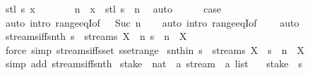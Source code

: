 \begin{isabellebody}
\ {\isacharparenleft}stl\ s\ x{\isacharparenright}\isanewline
\ \ \ \ \isamarkupfalse%
\ \isamarkupfalse%
\ n\ \ {\isachardoublequoteopen}x\ {\isacharequal}\ stl\ s\ {\isacharbang}{\isacharbang}\ n{\isachardoublequoteclose}\ \isamarkupfalse%
\ auto\isanewline
\ \ \ \ \isamarkupfalse%
\ {\isacharquery}case\ \isamarkupfalse%
\ {\isacharparenleft}auto\ intro{\isacharcolon}\ range{\isacharunderscore}eqI{\isacharbrackleft}of\ {\isacharunderscore}\ {\isacharunderscore}\ {\isachardoublequoteopen}Suc\ n{\isachardoublequoteclose}{\isacharbrackright}{\isacharparenright}\isanewline
\ \ \isamarkupfalse%
\ {\isacharparenleft}auto\ intro{\isacharcolon}\ range{\isacharunderscore}eqI{\isacharbrackleft}of\ {\isacharunderscore}\ {\isacharunderscore}\ {}{\isacharbrackright}{\isacharparenright}\isanewline
{}\isamarkupfalse%
\ auto%
\endisatagproof
{\isafoldproof}%
%
\isadelimproof
\isanewline
%
\endisadelimproof
\isanewline
{}\isamarkupfalse%
\ streams{\isacharunderscore}iff{\isacharunderscore}snth{\isacharcolon}\ {\isachardoublequoteopen}s\ {\isasymin}\ streams\ X\ {\isasymlongleftrightarrow}\ {\isacharparenleft}{\isasymforall}n{\isachardot}\ s\ {\isacharbang}{\isacharbang}\ n\ {\isasymin}\ X{\isacharparenright}{\isachardoublequoteclose}\isanewline
%
\isadelimproof
\ \ %
\endisadelimproof
%
\isatagproof
{}\isamarkupfalse%
\ {\isacharparenleft}force\ simp{\isacharcolon}\ streams{\isacharunderscore}iff{\isacharunderscore}sset\ sset{\isacharunderscore}range{\isacharparenright}%
\endisatagproof
{\isafoldproof}%
%
\isadelimproof
\isanewline
%
\endisadelimproof
\isanewline
{}\isamarkupfalse%
\ snth{\isacharunderscore}in{\isacharcolon}\ {\isachardoublequoteopen}s\ {\isasymin}\ streams\ X\ {\isasymLongrightarrow}\ s\ {\isacharbang}{\isacharbang}\ n\ {\isasymin}\ X{\isachardoublequoteclose}\isanewline
%
\isadelimproof
\ \ %
\endisadelimproof
%
\isatagproof
{}\isamarkupfalse%
\ {\isacharparenleft}simp\ add{\isacharcolon}\ streams{\isacharunderscore}iff{\isacharunderscore}snth{\isacharparenright}%
\endisatagproof
{\isafoldproof}%
%
\isadelimproof
\isanewline
%
\endisadelimproof
\isanewline
{}\isamarkupfalse%
\ stake\ {\isacharcolon}{\isacharcolon}\ {\isachardoublequoteopen}nat\ {\isasymRightarrow}\ {\isacharprime}a\ stream\ {\isasymRightarrow}\ {\isacharprime}a\ list{\isachardoublequoteclose}\ \isanewline
\ \ {\isachardoublequoteopen}stake\ {}\ s\ {\isacharequal}\ {\isacharbrackleft}{\isacharbrackright}{\isachardoublequoteclose}\isanewline

\end{isabellebody}
